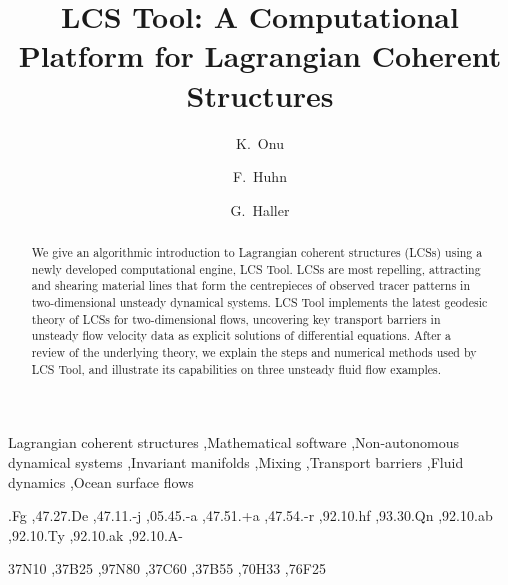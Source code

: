 \documentclass[5p]{elsarticle}
\begin{document}
\begin{frontmatter}

\title{LCS Tool: A Computational Platform for Lagrangian Coherent Structures}

\author{K.~Onu}

\author{F.~Huhn}

\author{G.~Haller}


\address{Institute of Mechanical Systems, ETH Zurich, Switzerland}

\begin{abstract}
We give an algorithmic introduction to Lagrangian coherent structures (LCSs) using a newly developed computational engine, LCS Tool. LCSs are most repelling, attracting and shearing material lines that form the centrepieces of observed tracer patterns in two-dimensional unsteady dynamical systems. LCS Tool implements the latest geodesic theory of LCSs for two-dimensional flows, uncovering key transport barriers in unsteady flow velocity data as explicit solutions of differential equations. After a review of the underlying theory, we explain the steps and numerical methods used by LCS Tool, and illustrate its capabilities on three unsteady fluid flow examples.
\end{abstract}

\begin{keyword}
Lagrangian coherent structures \sep Mathematical software \sep Non-autonomous dynamical systems \sep Invariant manifolds \sep Mixing \sep Transport barriers \sep Fluid dynamics \sep Ocean surface flows

.Fg \sep 47.27.De \sep 47.11.-j \sep 05.45.-a \sep 47.51.+a \sep 47.54.-r \sep 92.10.hf \sep 93.30.Qn \sep 92.10.ab \sep 92.10.Ty \sep 92.10.ak \sep 92.10.A-

\MSC[2010] 37N10 \sep 37B25 \sep 97N80 \sep 37C60 \sep 37B55 \sep 70H33 \sep 76F25
\end{keyword}

\end{frontmatter}
\end{document}
